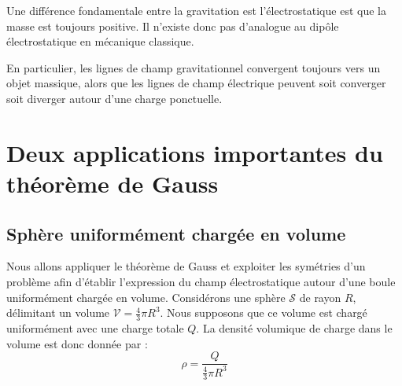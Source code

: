 \documentclass[11pt,fleqn]{book} %
\begin{document}
\begin{remark}
    Une différence fondamentale entre la gravitation est l'électrostatique est que la masse est toujours positive. Il n'existe donc pas d'analogue au dipôle électrostatique en mécanique classique.
    
    En particulier, les lignes de champ gravitationnel convergent toujours vers un objet massique, alors que les lignes de champ électrique peuvent soit converger soit diverger autour d'une charge ponctuelle.
\end{remark}

\section{Deux applications importantes du théorème de Gauss}

\subsection{Sphère uniformément chargée en volume}

Nous allons appliquer le théorème de Gauss et exploiter les symétries d'un problème afin d'établir l'expression du champ électrostatique autour d'une boule uniformément chargée en volume. Considérons une sphère $\mathcal{S}$ de rayon $R$, délimitant un volume $\mathcal{V} = \frac{4}{3} \pi R^3$. Nous supposons que ce volume est chargé uniformément avec une charge totale $Q$. La densité volumique de charge dans le volume est donc donnée par :
\begin{equation}
    \rho = \frac{Q}{\frac{4}{3} \pi R^3}
\end{equation}
\end{document}
